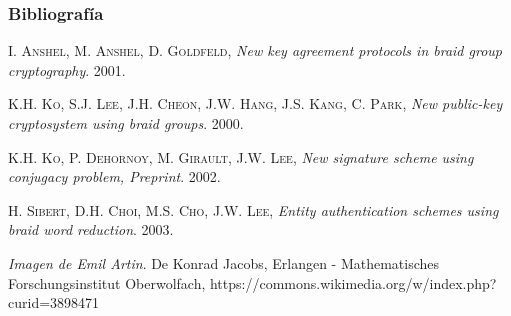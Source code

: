 \documentclass{beamer}
\begin{document}
\begin{frame}
\frametitle{Bibliografía}

\begin{thebibliography}{X}


\textsc{I. Anshel}, \textsc{M. Anshel}, \textsc{D. Goldfeld}, \textit{New key agreement protocols in braid group cryptography}. 2001.


\textsc{K.H. Ko}, \textsc{S.J. Lee}, \textsc{J.H. Cheon}, \textsc{J.W. Hang}, \textsc{J.S. Kang}, \textsc{C. Park}, \textit{New public-key cryptosystem using braid groups}. 2000.

\textsc{K.H. Ko}, \textsc{P. Dehornoy}, \textsc{M. Girault}, \textsc{J.W. Lee}, \textit{New signature scheme using conjugacy problem, Preprint}. 2002.

\textsc{H. Sibert}, \textsc{D.H. Choi}, \textsc{M.S. Cho}, \textsc{J.W. Lee}, \textit{Entity authentication schemes using braid word reduction}. 2003.

\textit{Imagen de Emil Artin}. De Konrad Jacobs, Erlangen - Mathematisches Forschungsinstitut Oberwolfach, https://commons.wikimedia.org/w/index.php?curid=3898471


\end{thebibliography}




\end{frame}
\end{document}
